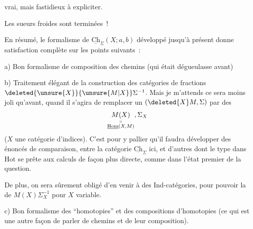 vrai, mais fastidieux à expliciter.

Les sueurs froides sont terminées~!

En résumé, le formalisme de  $\underline{\mathrm{Ch}}_\Sigma(X;a,b)$ développé jusqu'à présent donne satisfaction complète sur les points suivants~:

a) Bon formalisme de composition des chemins (qui était dégueulasse avant)

b) Traitement élégant de la construction des catégories de fractions $\deleted{\unsure{X}}{\unsure{M|X}}\Sigma^{-1}$. Mais je m'attends  ce sera moins joli qu'avant, quand il s'agira de remplacer un $(\deleted{X}M,\Sigma)$ par des
\[
\underset{\substack{\shortparallel\\\underline{\mathrm{Hom}}(X,M)}}{M(X)},\Sigma_X
\]
($X$ une catégorie d'indices). C'est pour y pallier qu'il  faudra développer des énoncés de comparaison, entre la catégorie $\underline{\mathrm{Ch}}_\Sigma$  ici, et d'autres  dont le type dans $\mathrm{Hot}$ se prête aux calculs de façon plus directe, comme dans l'état premier de la question.

De plus, on sera sûrement obligé d'en venir à des Ind-catégories, pour pouvoir  la  de $M(X)\Sigma_X^{-1}$ pour $X$ variable.

c) Bon formalisme des ``homotopies'' et des compositions d'homotopies (ce qui est une autre façon de parler de chemins et de leur composition).
